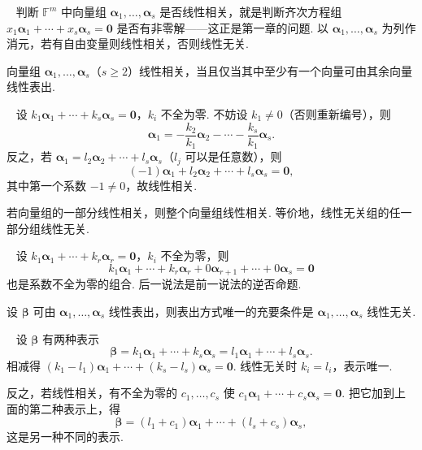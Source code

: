 \documentclass[lang=cn,10.5pt,scheme=chinese,toc=twocol,section,chinesefont=nofont,
twoside,citestyle=gb7714-2015,bibstyle=gb7714-2015]{elegantbook}
\newcommand{\vv}[1]{\boldsymbol{#1}}
\newcommand{\zero}{\boldsymbol{0}}          %
\numberwithin{equation}{section}   %
\newcommand*{\lnlabel}[1]{{\sffamily\bfseries\color{black}#1}}
\renewenvironment{example}[1][]{%
	\refstepcounter{exam}%
	\par\noindent\lnlabel{\examplename\ \theexam\ifblank{#1}{}{\ #1}}\ \rmfamily}{%
	\par\ignorespacesafterend}
\renewenvironment{proof}{%
	\par\noindent\lnlabel{\proofname}\;\ \color{black!90}\cfs}{\par}
\begin{document}
\begin{example}
  判断 $\mathbb{F}^m$ 中向量组 $\vv\alpha_1,\ldots,\vv\alpha_s$ 是否线性相关，就是判断齐次方程组 $x_1\vv\alpha_1+\cdots+x_s\vv\alpha_s=\zero$ 是否有非零解——这正是第一章的问题. 以 $\vv\alpha_1,\ldots,\vv\alpha_s$ 为列作消元，若有自由变量则线性相关，否则线性无关.
\end{example}

\begin{theorem}
  \label{thm:relvandexp}
  向量组 $\vv{\alpha}_1,\ldots,\vv{\alpha}_s$（$s\ge 2$）线性相关，当且仅当其中至少有一个向量可由其余向量线性表出.
\end{theorem}
\begin{proof}
  设 $k_1\vv{\alpha}_1+\cdots+k_s\vv{\alpha}_s=\zero$，$k_i$ 不全为零. 不妨设 $k_1\ne0$（否则重新编号），则
  \[\vv\alpha_1=-\frac{k_2}{k_1}\vv\alpha_2-\cdots-\frac{k_s}{k_1}\vv\alpha_s.\]
  反之，若 $\vv{\alpha}_1=l_2\vv{\alpha}_2+\cdots+l_s\vv{\alpha}_s$（$l_j$ 可以是任意数），则
  \[(-1)\vv{\alpha}_1+l_2\vv{\alpha}_2+\cdots+l_s\vv{\alpha}_s=\zero,\]
  其中第一个系数 $-1\ne0$，故线性相关.
\end{proof}

\begin{theorem}
  若向量组的一部分线性相关，则整个向量组线性相关. 等价地，线性无关组的任一部分组线性无关.
\end{theorem}
\begin{proof}
  设 $k_1\vv{\alpha}_1+\cdots+k_r\vv{\alpha}_r=\zero$，$k_i$ 不全为零，则
  \[k_1\vv{\alpha}_1+\cdots+k_r\vv{\alpha}_r+0\vv\alpha_{r+1}+\cdots+0\vv{\alpha}_{s}=\zero\]
  也是系数不全为零的组合. 后一说法是前一说法的逆否命题.
\end{proof}

\begin{theorem}
  \label{thm:uniquerep}
  设 $\vv{\beta}$ 可由 $\vv{\alpha}_1,\ldots,\vv{\alpha}_s$ 线性表出，则表出方式唯一的充要条件是 $\vv{\alpha}_1,\ldots,\vv{\alpha}_s$ 线性无关.
\end{theorem}
\begin{proof}
  设 $\vv\beta$ 有两种表示
  \[\vv{\beta}=k_1\vv\alpha_1+\cdots+k_s\vv\alpha_s=l_1\vv\alpha_1+\cdots+l_s\vv\alpha_s.\]
  相减得 $(k_1-l_1)\vv\alpha_1+\cdots+(k_s-l_s)\vv\alpha_s=\zero$. 线性无关时 $k_i=l_i$，表示唯一.

  反之，若线性相关，有不全为零的 $c_1,\ldots,c_s$ 使 $c_1\vv\alpha_1+\cdots+c_s\vv\alpha_s=\zero$. 把它加到上面的第二种表示上，得
  \[\vv{\beta}=(l_1+c_1)\vv\alpha_1+\cdots+(l_s+c_s)\vv\alpha_s,\]
  这是另一种不同的表示.
\end{proof}
\end{document}
